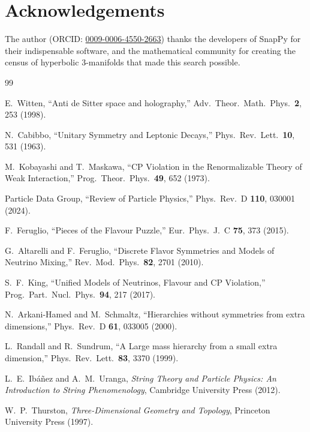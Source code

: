 \documentclass[11pt,a4paper]{article}
\begin{document}
\section*{Acknowledgements}
The author (ORCID: \href{https://orcid.org/0009-0006-4550-2663}{0009-0006-4550-2663})
thanks the developers of SnapPy for their indispensable
software, and the mathematical community for creating the census of
hyperbolic 3-manifolds that made this search possible.


\begin{thebibliography}{99}

E.~Witten,
``Anti de Sitter space and holography,''
Adv.\ Theor.\ Math.\ Phys.\ \textbf{2}, 253 (1998).

N.~Cabibbo,
``Unitary Symmetry and Leptonic Decays,''
Phys.\ Rev.\ Lett.\ \textbf{10}, 531 (1963).

M.~Kobayashi and T.~Maskawa,
``CP Violation in the Renormalizable Theory of Weak Interaction,''
Prog.\ Theor.\ Phys.\ \textbf{49}, 652 (1973).

Particle Data Group,
``Review of Particle Physics,''
Phys.\ Rev.\ D \textbf{110}, 030001 (2024).

F.~Feruglio,
``Pieces of the Flavour Puzzle,''
Eur.\ Phys.\ J.\ C \textbf{75}, 373 (2015).

G.~Altarelli and F.~Feruglio,
``Discrete Flavor Symmetries and Models of Neutrino Mixing,''
Rev.\ Mod.\ Phys.\ \textbf{82}, 2701 (2010).

S.~F.~King,
``Unified Models of Neutrinos, Flavour and CP Violation,''
Prog.\ Part.\ Nucl.\ Phys.\ \textbf{94}, 217 (2017).

N.~Arkani-Hamed and M.~Schmaltz,
``Hierarchies without symmetries from extra dimensions,''
Phys.\ Rev.\ D \textbf{61}, 033005 (2000).

L.~Randall and R.~Sundrum,
``A Large mass hierarchy from a small extra dimension,''
Phys.\ Rev.\ Lett.\ \textbf{83}, 3370 (1999).

L.~E.~Ib\'a\~nez and A.~M.~Uranga,
\emph{String Theory and Particle Physics: An Introduction to String Phenomenology},
Cambridge University Press (2012).

W.~P.~Thurston,
\emph{Three-Dimensional Geometry and Topology},
Princeton University Press (1997).


\end{thebibliography}
\end{document}
